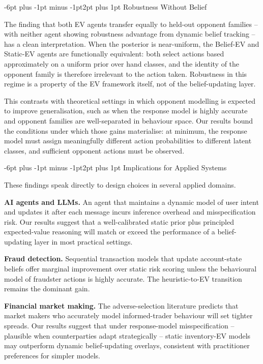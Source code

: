 \documentclass[12pt]{article}
\makeatletter
\renewcommand\subsection{\@startsection{subsection}{2}{\z@}%
  {-6pt plus -1pt minus -1pt}{2pt plus 1pt}%
  {\normalfont\normalsize\bfseries}}
\makeatother
\begin{document}
\subsection{Robustness Without Belief}

The finding that both EV agents transfer equally to held-out
opponent families -- with neither agent showing robustness advantage
from dynamic belief tracking -- has a clean interpretation.
When the posterior is near-uniform, the Belief-EV and Static-EV
agents are functionally equivalent: both select actions based
approximately on a uniform prior over hand classes, and the
identity of the opponent family is therefore irrelevant to the
action taken.
Robustness in this regime is a property of the EV framework
itself, not of the belief-updating layer.

This contrasts with theoretical settings in which opponent
modelling is expected to improve generalisation, such as when
the response model is highly accurate and opponent families are
well-separated in behaviour space\cite{albrecht2018survey,
tuyls2012multiagent}.
Our results bound the conditions under which those gains
materialise: at minimum, the response model must assign
meaningfully different action probabilities to different latent
classes, and sufficient opponent actions must be observed.

\subsection{Implications for Applied Systems}

These findings speak directly to design choices in several
applied domains.

\textbf{AI agents and LLMs.}
An agent that maintains a dynamic model of user intent and updates
it after each message incurs inference overhead and misspecification
risk.
Our results suggest that a well-calibrated static prior plus
principled expected-value reasoning will match or exceed the
performance of a belief-updating layer in most practical
settings\cite{silver2016alphago,mnih2015dqn}.

\textbf{Fraud detection.}
Sequential transaction models that update account-state beliefs
offer marginal improvement over static risk scoring unless the
behavioural model of fraudster actions is highly accurate.
The heuristic-to-EV transition remains the dominant
gain\cite{dalpozzolo2015fraud}.

\textbf{Financial market making.}
The adverse-selection literature\cite{glosten1985bid} predicts
that market makers who accurately model informed-trader behaviour
will set tighter spreads.
Our results suggest that under response-model misspecification --
plausible when counterparties adapt strategically -- static
inventory-EV models may outperform dynamic belief-updating
overlays, consistent with practitioner preferences for simpler
models.
\end{document}
